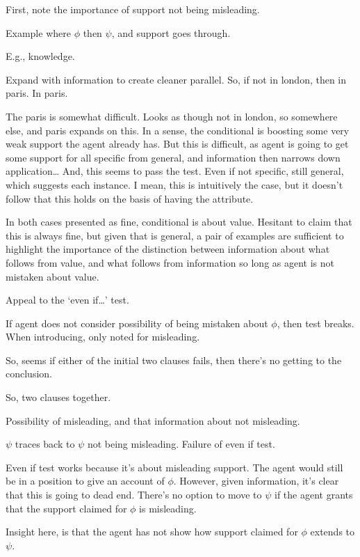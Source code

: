\begin{note}
  First, note the importance of support not being misleading.

  Example where \(\phi\) then \(\psi\), and support goes through.

  E.g., knowledge.

  Expand with information to create cleaner parallel.
  So, if not in london, then in paris.
  In paris.

  The paris is somewhat difficult.
  Looks as though not in london, so somewhere else, and paris expands on this.
  In a sense, the conditional is boosting some very weak support the agent already has.
  {
    But this is difficult, as agent is going to get some support for all specific from general, and information then narrows down application\dots
    And, this seems to pass the test.
    Even if not specific, still general, which suggests each instance.
    I mean, this is intuitively the case, but it doesn't follow that this holds on the basis of having the attribute.
  }

  In both cases presented as fine, conditional is about value.
  Hesitant to claim that this is always fine, but given that \nI{} is general, a pair of examples are sufficient to highlight the importance of the distinction between information about what follows from value, and what follows from information so long as agent is not mistaken about value.
\end{note}

\begin{note}
  Appeal to the `even if\dots' test.

  If agent does not consider possibility of being mistaken about \(\phi\), then test breaks.
  When introducing, only noted for misleading.
\end{note}

\begin{note}
  So, seems if either of the initial two clauses fails, then there's no getting to the conclusion.
\end{note}

\begin{note}
  So, two clauses together.

  Possibility of misleading, and that information about not misleading.

  \(\psi\) traces back to \(\psi\) not being misleading.
  Failure of even if test.

  Even if test works because it's about misleading support.
  The agent would still be in a position to give an account of \(\phi\).
  However, given information, it's clear that this is going to dead end.
  There's no option to move to \(\psi\) if the agent grants that the support claimed for \(\phi\) is misleading.

  Insight here, is that the agent has not show how support claimed for \(\phi\) extends to \(\psi\).
\end{note}

